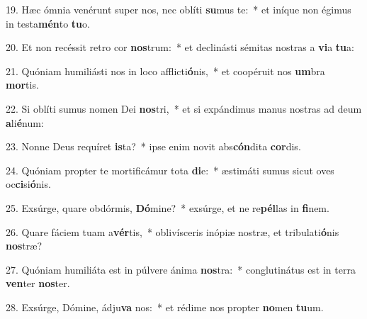 19. Hæc ómnia venérunt super nos, nec oblíti \textbf{su}mus te:~*  et iníque non égimus in testa\textbf{mén}to \textbf{tu}o.\

20. Et non recéssit retro cor \textbf{nos}trum:~*  et declinásti sémitas nostras a \textbf{vi}a \textbf{tu}a:\

21. Quóniam humiliásti nos in loco afflicti\textbf{ó}nis,~*  et coopéruit nos \textbf{um}bra \textbf{mor}tis.\

22. Si oblíti sumus nomen Dei \textbf{nos}tri,~*  et si expándimus manus nostras ad deum \textbf{a}li\textbf{é}num:\

23. Nonne Deus requíret \textbf{is}ta?~*  ipse enim novit abs\textbf{cón}dita \textbf{cor}dis.\

24. Quóniam propter te mortificámur tota \textbf{di}e:~*  æstimáti sumus sicut oves oc\textbf{ci}si\textbf{ó}nis.\

25. Exsúrge, quare obdórmis, \textbf{Dó}mine?~*  exsúrge, et ne re\textbf{pél}las in \textbf{fi}nem.\

26. Quare fáciem tuam a\textbf{vér}tis,~*  oblivísceris inópiæ nostræ, et tribulati\textbf{ó}nis \textbf{nos}træ?\

27. Quóniam humiliáta est in púlvere ánima \textbf{nos}tra:~*  conglutinátus est in terra \textbf{ven}ter \textbf{nos}ter.\

28. Exsúrge, Dómine, ádju\textbf{va} nos:~*  et rédime nos propter \textbf{no}men \textbf{tu}um.\

